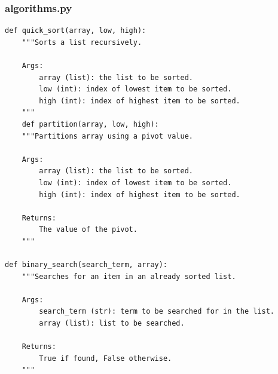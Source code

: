 \subsubsection{algorithms.py}
\begin{verbatim}
def quick_sort(array, low, high):
	"""Sorts a list recursively.

	Args:
		array (list): the list to be sorted.
		low (int): index of lowest item to be sorted.
		high (int): index of highest item to be sorted.
	"""
	def partition(array, low, high):
	"""Partitions array using a pivot value.
	
	Args:
		array (list): the list to be sorted.
		low (int): index of lowest item to be sorted.
		high (int): index of highest item to be sorted.
	
	Returns:
		The value of the pivot.
	"""

def binary_search(search_term, array):
	"""Searches for an item in an already sorted list.

	Args:
		search_term (str): term to be searched for in the list.
		array (list): list to be searched.
	
	Returns:
		True if found, False otherwise.
	"""
\end{verbatim}
